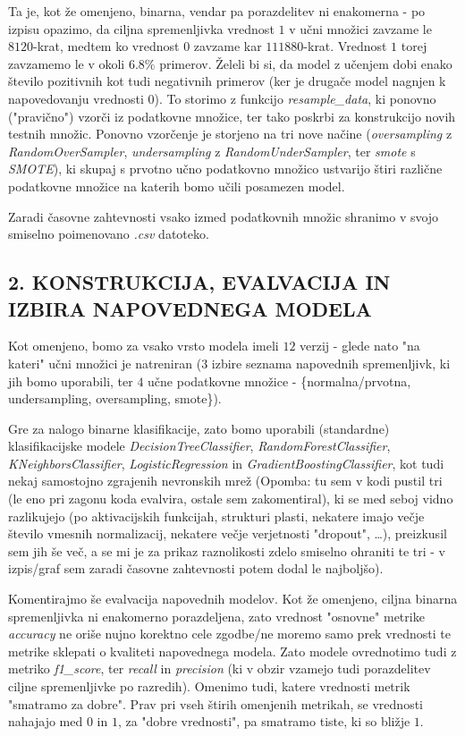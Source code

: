 \documentclass{article}
\begin{document}
Ta je, kot že omenjeno, binarna, vendar pa porazdelitev ni enakomerna - po izpisu opazimo, da ciljna spremenljivka vrednost $1$ v učni množici zavzame le $8120$-krat, medtem ko vrednost $0$ zavzame kar $111880$-krat. 
Vrednost $1$ torej zavzamemo le v okoli $6.8 \%$ primerov. Želeli bi si, da model z učenjem dobi enako število pozitivnih kot tudi negativnih primerov (ker je drugače model nagnjen k napovedovanju vrednosti $0$).
To storimo z funkcijo \textit{resample\_data}, ki ponovno ("pravično") vzorči iz podatkovne množice, ter tako poskrbi za konstrukcijo novih testnih množic. 
Ponovno vzorčenje je storjeno na tri nove načine (\textit{oversampling} z \textit{ RandomOverSampler},  \textit{undersampling} z \textit{ RandomUnderSampler}, ter \textit{smote} s \textit{SMOTE}), 
ki skupaj s prvotno učno podatkovno množico ustvarijo štiri različne podatkovne množice na katerih bomo učili posamezen model. 

Zaradi časovne zahtevnosti vsako izmed podatkovnih množic shranimo v svojo smiselno poimenovano \textit{.csv} datoteko.

\subsection*{2. KONSTRUKCIJA, EVALVACIJA IN IZBIRA NAPOVEDNEGA MODELA}

Kot omenjeno, bomo za vsako vrsto modela imeli $12$ verzij - glede nato "na kateri" učni množici je natreniran ($3$ izbire seznama napovednih spremenljivk, ki jih bomo uporabili, ter $4$ učne podatkovne množice - \{normalna/prvotna, undersampling, oversampling, smote\}).

Gre za nalogo binarne klasifikacije, zato bomo uporabili (standardne) klasifikacijske modele \textit{DecisionTreeClassifier}, \textit{RandomForestClassifier}, \textit{KNeighborsClassifier}, \textit{LogisticRegression} in \textit{GradientBoostingClassifier}, 
kot tudi nekaj samostojno zgrajenih nevronskih mrež (Opomba: tu sem v kodi pustil tri (le eno pri zagonu koda evalvira, ostale sem zakomentiral), ki se med seboj vidno razlikujejo (po aktivacijskih funkcijah, strukturi plasti, nekatere imajo večje število vmesnih normalizacij, nekatere večje verjetnosti "dropout", \dots), preizkusil sem jih še več, a se mi je za prikaz raznolikosti zdelo smiselno ohraniti te tri - v izpis/graf sem zaradi časovne zahtevnosti potem dodal le najboljšo).

Komentirajmo še evalvacija napovednih modelov. Kot že omenjeno, ciljna binarna spremenljivka ni enakomerno porazdeljena, zato vrednost "osnovne" metrike \textit{accuracy} ne oriše nujno korektno cele zgodbe/ne moremo samo prek vrednosti te metrike sklepati o kvaliteti napovednega modela. 
Zato modele ovrednotimo tudi z metriko \textit{f1\_score}, ter \textit{recall} in \textit{precision} (ki v obzir vzamejo tudi porazdelitev ciljne spremenljivke po razredih). Omenimo tudi, katere vrednosti metrik "smatramo za dobre". 
Prav pri vseh štirih omenjenih metrikah, se vrednosti nahajajo med $0$ in $1$, za "dobre vrednosti", pa smatramo tiste, ki so bližje $1$.
\end{document}
